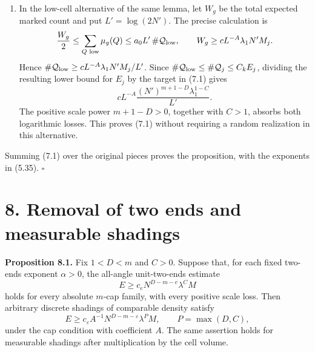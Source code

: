 \documentclass[
  11pt,
  a4paper,
]{article}
\begin{document}
\begin{enumerate}
  In the high-cell alternative, the minimum full two-ends threshold is
  \[
  c\lambda_1(N')^{1-\alpha}>c(N')^{5/12}.
  \] Lemma 6.1 controls all \(O_k((N')^{2k-1}\log N')\) tube-ball tests
  and the angular-net tests simultaneously. Its output satisfies the
  transverse core hypotheses with logarithmic conditioning. Applying the
  core gives \[
  E_j^{\mathrm s}\ge c_e(N')^{D-e}\lambda_1^{C+e}
                \frac{M_j}{(N')^m}.
  \] Use \(E_j^{\mathrm s}\le\#\mathcal Q_j\le C_kE_j\). Since
  \(\lambda_1>(N')^{-1/3}\), the extra density factor costs at most
  \((N')^{-e/3}\), proving (7.1) with an arbitrarily small scale loss.
  The test counts depend on the ambient sphere, even when \(m\) is real.

  Also \(\sigma N'\gtrsim\lambda_1^2N'>(N')^{1/3}\), up to fixed
  factors. Equations (5.22)--(5.23) give lifted mass
  \(\rho_{\rm lift}N'Q\) with \(\rho_{\rm lift}\ge c\kappa^6\sigma\).
  Integer trimming and the one-tube bound cover the remaining bounded
  scales.
\item
  In the low-cell alternative of the same lemma, let \(W_g\) be the
  total expected marked count and put \(L'=\log(2N')\). The precise
  calculation is \[
  \frac{W_g}{2}\le\sum_{Q\text{ low}}\mu_g(Q)
  \le a_0L'\,\#\mathcal Q_{\rm low},
  \qquad W_g\ge cL^{-A}\lambda_1N'M_j.
  \] Hence \(\#\mathcal Q_{\rm low}\ge cL^{-A}\lambda_1N'M_j/L'\). Since
  \(\#\mathcal Q_{\rm low}\le\#\mathcal Q_j\le C_kE_j\), dividing the
  resulting lower bound for \(E_j\) by the target in (7.1) gives \[
  cL^{-A}\frac{(N')^{m+1-D}\lambda_1^{1-C}}{L'}.
  \] The positive scale power \(m+1-D>0\), together with \(C>1\),
  absorbs both logarithmic losses. This proves (7.1) without requiring a
  random realization in this alternative.
\end{enumerate}

Summing (7.1) over the original pieces proves the proposition, with the
exponents in (5.35). \(\square\)

\hypertarget{removal-of-two-ends-and-measurable-shadings}{%
\section{8. Removal of two ends and measurable
shadings}\label{removal-of-two-ends-and-measurable-shadings}}

\textbf{Proposition 8.1.} Fix \(1<D<m\) and \(C>0\). Suppose that, for
each fixed two-ends exponent \(\alpha>0\), the all-angle unit-two-ends
estimate \[
 E\ge c_eN^{D-m-e}\lambda^C M
\] holds for every absolute \(m\)-cap family, with every positive scale
loss. Then arbitrary discrete shadings of comparable density satisfy \[
 E\ge c_\varepsilon A^{-1}N^{D-m-\varepsilon}
       \lambda^P M,\qquad P=\max(D,C),
\] under the cap condition with coefficient \(A\). The same assertion
holds for measurable shadings after multiplication by the cell volume.
\end{document}
